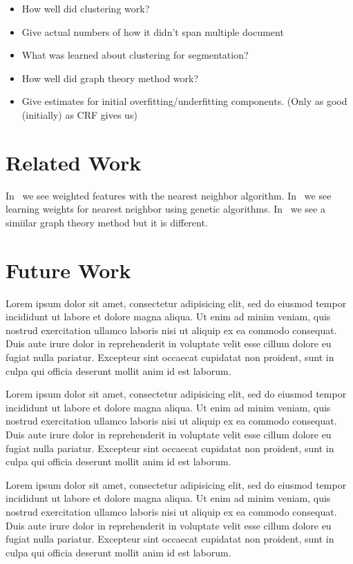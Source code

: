 \documentclass[10pt]{acmsiggraph}               %
\begin{document}
\begin{itemize}
\item How well did clustering work? 
\item Give actual numbers of how it didn't span multiple document
\item What was learned about clustering for segmentation?
\item How well did graph theory method work? 
\item Give estimates for initial overfitting/underfitting components. (Only as good (initially) as CRF gives us)
\end{itemize}

\section{Related Work}

In~\cite{dietrich95weighting} we see weighted features with the nearest neighbor algorithm.
In~\cite{demiroz96genetic} we see learning weights for nearest neighbor using genetic algorithms.
In~\cite{spatial} we see a simiilar graph theory method but it is different.

\section{Future Work}
Lorem ipsum dolor sit amet, consectetur adipisicing elit, sed do eiusmod tempor incididunt ut labore et dolore magna aliqua. Ut enim ad minim veniam, quis nostrud exercitation ullamco laboris nisi ut aliquip ex ea commodo consequat. Duis aute irure dolor in reprehenderit in voluptate velit esse cillum dolore eu fugiat nulla pariatur. Excepteur sint occaecat cupidatat non proident, sunt in culpa qui officia deserunt mollit anim id est laborum.

Lorem ipsum dolor sit amet, consectetur adipisicing elit, sed do eiusmod tempor incididunt ut labore et dolore magna aliqua. Ut enim ad minim veniam, quis nostrud exercitation ullamco laboris nisi ut aliquip ex ea commodo consequat. Duis aute irure dolor in reprehenderit in voluptate velit esse cillum dolore eu fugiat nulla pariatur. Excepteur sint occaecat cupidatat non proident, sunt in culpa qui officia deserunt mollit anim id est laborum.

Lorem ipsum dolor sit amet, consectetur adipisicing elit, sed do eiusmod tempor incididunt ut labore et dolore magna aliqua. Ut enim ad minim veniam, quis nostrud exercitation ullamco laboris nisi ut aliquip ex ea commodo consequat. Duis aute irure dolor in reprehenderit in voluptate velit esse cillum dolore eu fugiat nulla pariatur. Excepteur sint occaecat cupidatat non proident, sunt in culpa qui officia deserunt mollit anim id est laborum.
\end{document}
